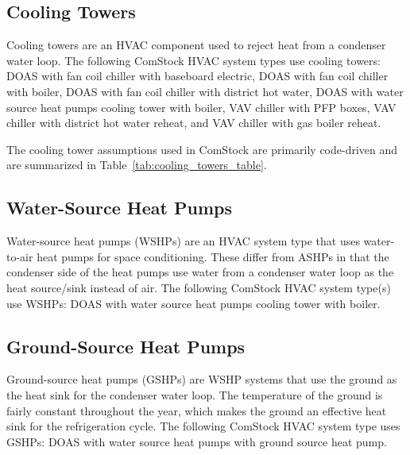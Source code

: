 \subsection{Cooling Towers}

Cooling towers are an HVAC component used to reject heat from a condenser water loop. The following ComStock HVAC system types use cooling towers: DOAS with fan coil chiller with baseboard electric, DOAS with fan coil chiller with boiler, DOAS with fan coil chiller with district hot water, DOAS with water source heat pumps cooling tower with boiler, VAV chiller with PFP boxes, VAV chiller with district hot water reheat, and VAV chiller with gas boiler reheat.

The cooling tower assumptions used in ComStock are primarily code-driven and are summarized in Table~\ref{tab:cooling_towers_table}.



\subsection{Water-Source Heat Pumps}

Water-source heat pumps (WSHPs) are an HVAC system type that uses water-to-air heat pumps for space conditioning. These differ from ASHPs in that the condenser side of the heat pumps use water from a condenser water loop as the heat source/sink instead of air. The following ComStock HVAC system type(s) use WSHPs: DOAS with water source heat pumps cooling tower with boiler.  

\subsection{Ground-Source Heat Pumps}
Ground-source heat pumps (GSHPs) are WSHP systems that use the ground as the heat sink for the condenser water loop. The temperature of the ground is fairly constant throughout the year, which makes the ground an effective heat sink for the refrigeration cycle. The following ComStock HVAC system type uses GSHPs: DOAS with water source heat pumps with ground source heat pump.

